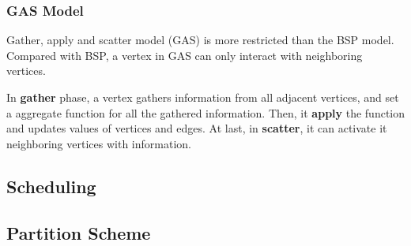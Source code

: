 \subsubsection{GAS Model}
Gather, apply and scatter model (GAS) is more restricted than the BSP model.
Compared with BSP, a vertex in GAS can only interact with neighboring
vertices.

In \textbf{gather} phase, a vertex gathers information from all adjacent vertices, and
set a aggregate function for all the gathered information. Then, it \textbf{apply}
the function and updates values of vertices and edges. At last, in \textbf{scatter},
it can activate it neighboring vertices with information.


\subsection{Scheduling}
\subsection{Partition Scheme}
